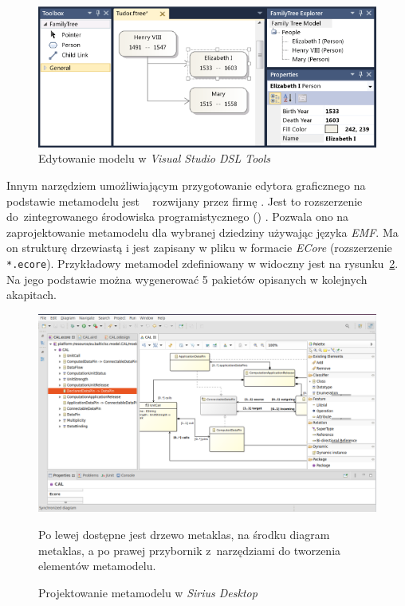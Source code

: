 \begin{figure}[!ht]
	\centering

	\includegraphics[width=0.95\linewidth]{./images/visual-studio-dsl-example.png}
	\caption{Edytowanie modelu w \emph{Visual Studio DSL
			Tools}}\label{rys:visual-studio-dsl-example}
\end{figure}

Innym narzędziem umożliwiającym przygotowanie edytora graficznego na podstawie
metamodelu jest \SiriusDesktop{}~\cite{sirius-desktop-homepage} rozwijany
przez firmę \Eclipse{}. Jest to rozszerzenie do~zintegrowanego środowiska
programistycznego () \Eclipse{}. Pozwala ono na zaprojektowanie
metamodelu dla wybranej dziedziny używając języka \emph{\acrfull{EMF}}. Ma on
strukturę drzewiastą i jest
zapisany w pliku  w formacie \emph{ECore} (rozszerzenie
\texttt{*.ecore}). Przykładowy metamodel zdefiniowany w \SiriusDesktop{}
widoczny jest na rysunku~\ref{rys:sirius-desktop-example-metamodel}. Na jego
podstawie można wygenerować 5 pakietów opisanych w kolejnych akapitach.

\begin{figure}[!ht]
	\centering

	\includegraphics[width=0.95\linewidth]{./images/sirius-desktop-metamodel.png}
	\caption{Projektowanie metamodelu w \emph{Sirius
			Desktop}}\label{rys:sirius-desktop-example-metamodel}
	\medskip
	{\small Po lewej dostępne jest drzewo metaklas, na środku diagram
		metaklas, a po prawej przybornik z~narzędziami do tworzenia
		elementów metamodelu.}
\end{figure}

